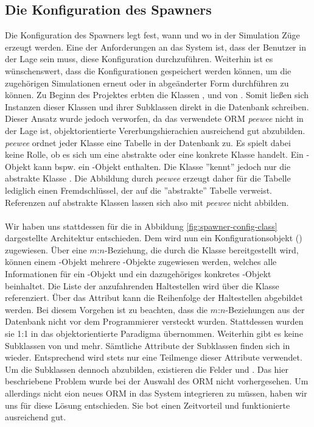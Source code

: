 \subsection{Die Konfiguration des Spawners}

Die Konfiguration des Spawners legt fest, wann und wo in der Simulation Züge erzeugt werden. Eine der Anforderungen an das System ist, dass der Benutzer in der Lage sein muss, diese Konfiguration durchzuführen. Weiterhin ist es wünschenswert, dass die Konfigurationen gespeichert werden können, um die zugehörigen Simulationen erneut oder in abgeänderter Form durchführen zu können. Zu Beginn des Projektes erbten die Klassen ,  und  von . Somit ließen sich Instanzen dieser Klassen und ihrer Subklassen direkt in die Datenbank schreiben. Dieser Ansatz wurde jedoch verworfen, da das verwendete ORM \emph{peewee} nicht in der Lage ist, objektorientierte Vererbungshierachien ausreichend gut abzubilden. \emph{peewee} ordnet jeder Klasse eine Tabelle in der Datenbank zu. Es spielt dabei keine Rolle, ob es sich um eine abstrakte oder eine konkrete Klasse handelt. Ein -Objekt kann bspw. ein -Objekt enthalten. Die Klasse  ''kennt'' jedoch nur die abstrakte Klasse . Die Abbildung durch \emph{peewee} erzeugt daher für die Tabelle  lediglich einen Fremdschlüssel, der auf die ''abstrakte'' Tabelle  verweist. Referenzen auf abstrakte Klassen lassen sich also mit \emph{peewee} nicht abbilden.\\
\\
Wir haben uns stattdessen für die in Abbildung \ref{fig:spawner-config-class} dargestellte Architektur entschieden. Dem  wird nun ein Konfigurationsobjekt () zugewiesen. Über eine $m$:$n$-Beziehung, die durch die Klasse  bereitgestellt wird, können einem -Objekt mehrere -Objekte zugewiesen werden, welches alle Informationen für ein -Objekt und ein dazugehöriges konkretes -Objekt beinhaltet. Die Liste der anzufahrenden Haltestellen wird über die Klasse  referenziert. Über das Attribut  kann die Reihenfolge der Haltestellen abgebildet werden. Bei diesem Vorgehen ist zu beachten, dass die $m$:$n$-Beziehungen aus der Datenbank nicht vor dem Programmierer versteckt wurden. Stattdessen wurden sie 1:1 in das objektorientierte Paradigma übernommen. Weiterhin gibt es keine Subklassen von  und  mehr. Sämtliche Attribute der Subklassen finden sich in  wieder. Entsprechend wird stets nur eine Teilmenge dieser Attribute verwendet. Um die Subklassen dennoch abzubilden, existieren die Felder  und . Das hier beschriebene Problem wurde bei der Auswahl des ORM nicht vorhergesehen. Um allerdings nicht eion neues ORM in das System integrieren zu müssen, haben wir uns für diese Lösung entschieden. Sie bot einen Zeitvorteil und funktionierte ausreichend gut.

